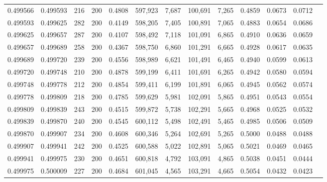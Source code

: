 \begin{tabular}{rrrrrrrrrrrrr}
0.499566 & 0.499593 &   216 & 200 &                                     0.4808 & 597,923 &   7,687 & 100,691 &   7,265 & 0.4859 & 0.0673 & 0.0712 \\
0.499593 & 0.499625 &   282 & 200 &                                     0.4149 & 598,205 &   7,405 & 100,891 &   7,065 & 0.4883 & 0.0654 & 0.0686 \\
0.499625 & 0.499657 &   287 & 200 &                                     0.4107 & 598,492 &   7,118 & 101,091 &   6,865 & 0.4910 & 0.0636 & 0.0659 \\
0.499657 & 0.499689 &   258 & 200 &                                     0.4367 & 598,750 &   6,860 & 101,291 &   6,665 & 0.4928 & 0.0617 & 0.0635 \\
0.499689 & 0.499720 &   239 & 200 &                                     0.4556 & 598,989 &   6,621 & 101,491 &   6,465 & 0.4940 & 0.0599 & 0.0613 \\
0.499720 & 0.499748 &   210 & 200 &                                     0.4878 & 599,199 &   6,411 & 101,691 &   6,265 & 0.4942 & 0.0580 & 0.0594 \\
0.499748 & 0.499778 &   212 & 200 &                                     0.4854 & 599,411 &   6,199 & 101,891 &   6,065 & 0.4945 & 0.0562 & 0.0574 \\
0.499778 & 0.499809 &   218 & 200 &                                     0.4785 & 599,629 &   5,981 & 102,091 &   5,865 & 0.4951 & 0.0543 & 0.0554 \\
0.499809 & 0.499839 &   243 & 200 &                                     0.4515 & 599,872 &   5,738 & 102,291 &   5,665 & 0.4968 & 0.0525 & 0.0532 \\
0.499839 & 0.499870 &   240 & 200 &                                     0.4545 & 600,112 &   5,498 & 102,491 &   5,465 & 0.4985 & 0.0506 & 0.0509 \\
0.499870 & 0.499907 &   234 & 200 &                                     0.4608 & 600,346 &   5,264 & 102,691 &   5,265 & 0.5000 & 0.0488 & 0.0488 \\
0.499907 & 0.499941 &   242 & 200 &                                     0.4525 & 600,588 &   5,022 & 102,891 &   5,065 & 0.5021 & 0.0469 & 0.0465 \\
0.499941 & 0.499975 &   230 & 200 &                                     0.4651 & 600,818 &   4,792 & 103,091 &   4,865 & 0.5038 & 0.0451 & 0.0444 \\
0.499975 & 0.500009 &   227 & 200 &                                     0.4684 & 601,045 &   4,565 & 103,291 &   4,665 & 0.5054 & 0.0432 & 0.0423 \\

\end{tabular}

